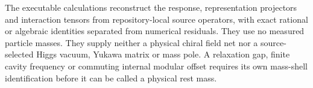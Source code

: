 The executable calculations reconstruct the response, representation
projectors and interaction tensors from repository-local source operators,
with exact rational or algebraic identities separated from numerical
residuals. They use no measured particle masses. They supply neither a
physical chiral field net nor a source-selected Higgs vacuum, Yukawa matrix
or mass pole. A relaxation gap, finite cavity frequency or commuting
internal modular offset requires its own mass-shell identification before
it can be called a physical rest mass.
